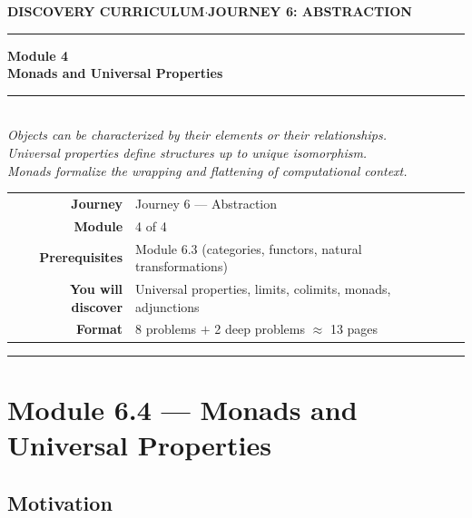 \documentclass[12pt, a4paper]{article}
\begin{document}
\thispagestyle{empty}
\begin{center}
{\small\color{ModuleColor}\textbf{DISCOVERY CURRICULUM}\quad$\cdot$\quad\textbf{JOURNEY 6: ABSTRACTION}}
\vspace{0.6cm}

{\color{NavyBlue}\rule{\linewidth}{2.5pt}}\vspace{0.5cm}

{\Huge\bfseries\color{NavyBlue}Module 4}\\[0.3cm]
{\LARGE\bfseries\color{ModuleColor}Monads and Universal Properties}\\[0.4cm]
{\color{PuzzleColor}\rule{0.4\linewidth}{1.5pt}}\\[0.4cm]
{\large\itshape\color{NavyBlue!80}
Objects can be characterized by their elements or their relationships.\\[0.15cm]
Universal properties define structures up to unique isomorphism.\\[0.15cm]
Monads formalize the wrapping and flattening of computational context.}

\vspace{1.4cm}
\begin{tabular}{rl}
\textbf{Journey}         & Journey 6 --- Abstraction \\[4pt]
\textbf{Module}          & 4 of 4 \\[4pt]
\textbf{Prerequisites}   & Module 6.3 (categories, functors, natural transformations) \\[4pt]
\textbf{You will discover} & Universal properties, limits, colimits, monads, adjunctions \\[4pt]
\textbf{Format}          & 8 problems $+$ 2 deep problems $\approx$ 13 pages \\
\end{tabular}
\vspace{1.2cm}

{\color{NavyBlue}\rule{\linewidth}{2.5pt}}
\end{center}

\newpage

\section{Module 6.4 --- Monads and Universal Properties}
\label{sec:mod6.4}

\subsection*{Motivation}
\end{document}
